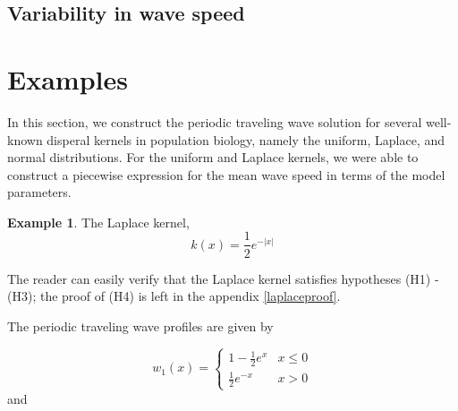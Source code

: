 \documentclass[11pt]{article}
\theoremstyle{definition}
\newtheorem{ex}[thm]{Example}
\numberwithin{equation}{section}
\numberwithin{thm}{section}
\renewcommand{\a}{\alpha}
\renewcommand{\b}{\beta}
\newcommand{\m}{\mu}
\begin{document}
\subsection{Variability in wave speed}

\section{Examples}

In this section, we construct the periodic traveling wave solution for several well-known disperal kernels in population biology, namely the uniform, Laplace, and normal distributions. For the uniform and Laplace kernels, we were able to construct a piecewise expression for the mean wave speed in terms of the model parameters. 

\begin{ex}
The Laplace kernel,
\begin{equation}\label{laplacekernel}
k(x) = \frac{1}{2} e^{-|x|}
\end{equation}

The reader can easily verify that the Laplace kernel satisfies hypotheses (H1) - (H3); the proof of (H4) is left in the appendix \ref{laplaceproof}.

The periodic traveling wave profiles are given by

\begin{equation} \label{w1laplace}
w_1(x) =   \begin{cases} 
1 - \frac{1}{2}e^{x} & x \leq 0 \\
\frac{1}{2}e^{-x} & x > 0
\end{cases}
\end{equation}
and


\end{ex}
\end{document}
